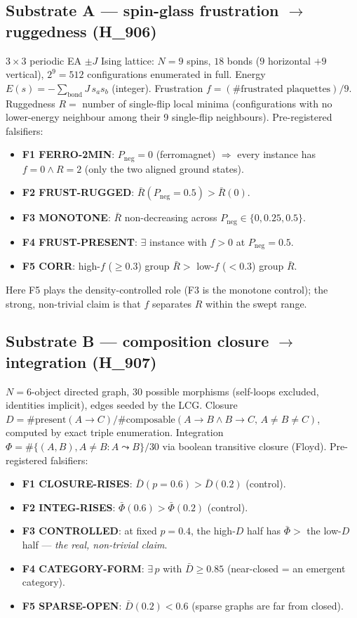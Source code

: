 \documentclass[11pt,a4paper]{article}
\begin{document}
\subsection{Substrate A --- spin-glass frustration $\to$ ruggedness (H\_906)}
$3{\times}3$ periodic EA $\pm J$ Ising lattice: $N{=}9$ spins, $18$ bonds
($9$ horizontal $+ 9$ vertical), $2^9 = 512$ configurations enumerated in full.
Energy $E(s) = -\sum_{\text{bond}} J\, s_a s_b$ (integer). Frustration
$f = (\#\text{frustrated plaquettes})/9$. Ruggedness $R = $ number of
single-flip local minima (configurations with no lower-energy neighbour among
their 9 single-flip neighbours). Pre-registered falsifiers:
\begin{itemize}\itemsep0.15em
  \item \textbf{F1 FERRO-2MIN}: $P_{\text{neg}}{=}0$ (ferromagnet) $\Rightarrow$
        every instance has $f{=}0 \wedge R{=}2$ (only the two aligned ground
        states).
  \item \textbf{F2 FRUST-RUGGED}: $\bar R(P_{\text{neg}}{=}0.5) > \bar R(0)$.
  \item \textbf{F3 MONOTONE}: $\bar R$ non-decreasing across
        $P_{\text{neg}}\in\{0,0.25,0.5\}$.
  \item \textbf{F4 FRUST-PRESENT}: $\exists$ instance with $f>0$ at
        $P_{\text{neg}}{=}0.5$.
  \item \textbf{F5 CORR}: high-$f$ ($\ge 0.3$) group $\bar R >$ low-$f$
        ($<0.3$) group $\bar R$.
\end{itemize}
Here F5 plays the density-controlled role (F3 is the monotone control); the
strong, non-trivial claim is that $f$ separates $R$ within the swept range.

\subsection{Substrate B --- composition closure $\to$ integration (H\_907)}
$N{=}6$-object directed graph, $30$ possible morphisms (self-loops excluded,
identities implicit), edges seeded by the LCG. Closure
$D = \#\text{present}(A{\to}C) / \#\text{composable}(A{\to}B \wedge B{\to}C,\,
A\!\ne\!B\!\ne\!C)$, computed by exact triple enumeration. Integration
$\Phi = \#\{(A,B), A\!\ne\!B : A \leadsto B\} / 30$ via boolean transitive
closure (Floyd). Pre-registered falsifiers:
\begin{itemize}\itemsep0.15em
  \item \textbf{F1 CLOSURE-RISES}: $\bar D(p{=}0.6) > \bar D(0.2)$ (control).
  \item \textbf{F2 INTEG-RISES}: $\bar\Phi(0.6) > \bar\Phi(0.2)$ (control).
  \item \textbf{F3 CONTROLLED}: at fixed $p{=}0.4$, the high-$D$ half has
        $\bar\Phi >$ the low-$D$ half --- \emph{the real, non-trivial claim}.
  \item \textbf{F4 CATEGORY-FORM}: $\exists\, p$ with $\bar D \ge 0.85$
        (near-closed = an emergent category).
  \item \textbf{F5 SPARSE-OPEN}: $\bar D(0.2) < 0.6$ (sparse graphs are far
        from closed).
\end{itemize}
\end{document}
